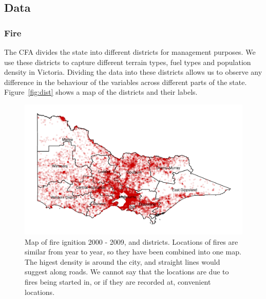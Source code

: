 \documentclass[11pt,a4paper]{article}
\begin{document}
\subsection{Data}

\subsubsection{Fire}

The CFA divides the state into different districts for management purposes. We use these districts to capture different terrain types, fuel types and population density in Victoria. Dividing the data into these districts allows us to observe any difference in the behaviour of the variables across different parts of the state. Figure~\ref{fig:dist} shows a map of the districts and their labels.


\begin{figure}
  \centering
  \includegraphics[width=.95\textwidth]{figures/firemap.pdf}
  \caption{Map of fire ignition 2000 - 2009, and districts. Locations of fires are similar from year to year, so they have been combined into one map. The higest density is around the city, and straight lines would suggest along roads. We cannot say that the locations are due to fires being started in, or if they are recorded at, convenient locations.}
  \label{fig:firemap}
\end{figure}
\end{document}
